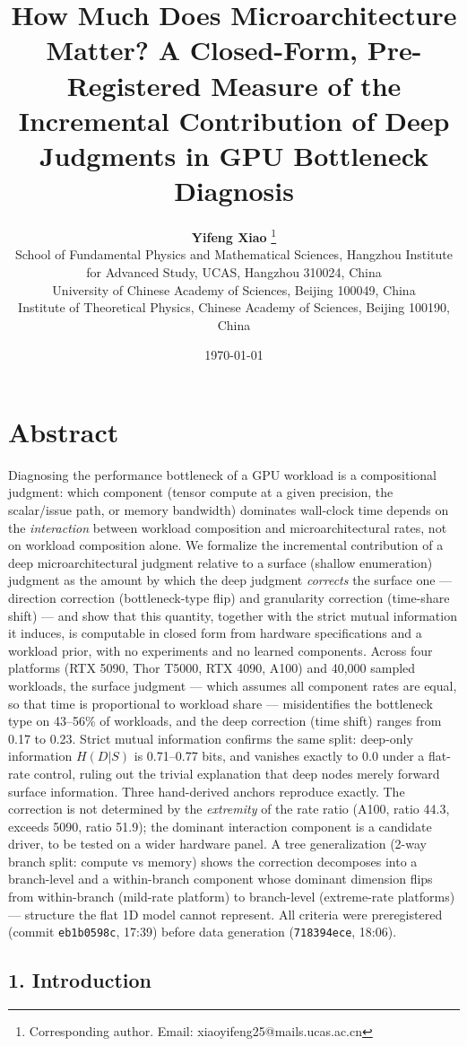 \documentclass[11pt]{article}
\title{How Much Does Microarchitecture Matter? A Closed-Form, Pre-Registered Measure of the Incremental Contribution of Deep Judgments in GPU Bottleneck Diagnosis}
\author{
  \textbf{Yifeng Xiao} \thanks{Corresponding author. Email: xiaoyifeng25@mails.ucas.ac.cn}\\
  School of Fundamental Physics and Mathematical Sciences, Hangzhou Institute for Advanced Study, UCAS, Hangzhou 310024, China\\
  University of Chinese Academy of Sciences, Beijing 100049, China\\
  Institute of Theoretical Physics, Chinese Academy of Sciences, Beijing 100190, China
}
\date{\today}
\begin{document}
\maketitle
\section*{Abstract}\label{abstract}

Diagnosing the performance bottleneck of a GPU workload is a compositional judgment: which component (tensor compute at a given precision, the scalar/issue path, or memory bandwidth) dominates wall-clock time depends on the \emph{interaction} between workload composition and microarchitectural rates, not on workload composition alone. We formalize the incremental contribution of a deep microarchitectural judgment relative to a surface (shallow enumeration) judgment as the amount by which the deep judgment \emph{corrects} the surface one --- direction correction (bottleneck-type flip) and granularity correction (time-share shift) --- and show that this quantity, together with the strict mutual information it induces, is computable in closed form from hardware specifications and a workload prior, with no experiments and no learned components. Across four platforms (RTX 5090, Thor T5000, RTX 4090, A100) and 40,000 sampled workloads, the surface judgment --- which assumes all component rates are equal, so that time is proportional to workload share --- misidentifies the bottleneck type on 43--56\% of workloads, and the deep correction (time shift) ranges from 0.17 to 0.23. Strict mutual information confirms the same split: deep-only information \(H(D|S)\) is 0.71--0.77 bits, and vanishes exactly to 0.0 under a flat-rate control, ruling out the trivial explanation that deep nodes merely forward surface information. Three hand-derived anchors reproduce exactly. The correction is not determined by the \emph{extremity} of the rate ratio (A100, ratio 44.3, exceeds 5090, ratio 51.9); the dominant interaction component is a candidate driver, to be tested on a wider hardware panel. A tree generalization (2-way branch split: compute vs memory) shows the correction decomposes into a branch-level and a within-branch component whose dominant dimension flips from within-branch (mild-rate platform) to branch-level (extreme-rate platforms) --- structure the flat 1D model cannot represent. All criteria were preregistered (commit \texttt{eb1b0598c}, 17:39) before data generation (\texttt{718394ece}, 18:06).

\subsection{1. Introduction}\label{introduction}
\end{document}
